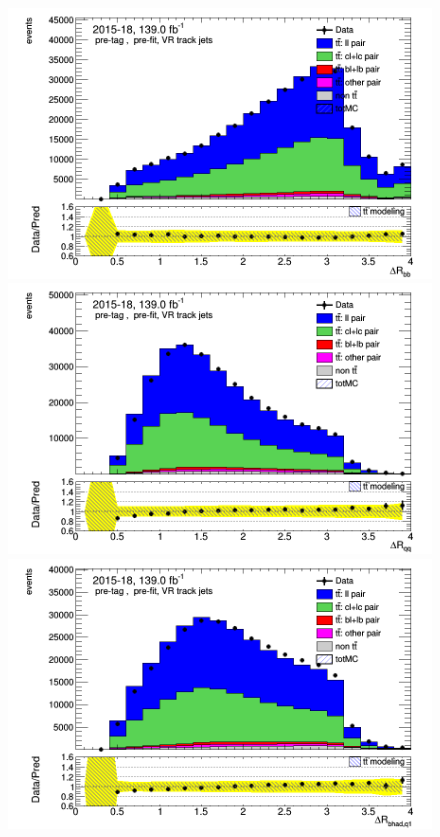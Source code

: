 \documentclass[letterpaper,12pt]{article}
\begin{document}
	
	\begin{figure}
	\begin{minipage}[b]{.45\textwidth}
	\centering
	\includegraphics[width=1\textwidth]{Oct_distributions/pretagNoRwDL1rwithhighpTVRJets_scaledall/DataMC_dRbb.png}
	\end{minipage}\hfill
	\begin{minipage}[b]{.45\textwidth}
	\centering
	\includegraphics[width=1\textwidth]{Oct_distributions/pretagNoRwDL1rwithhighpTVRJets_scaledall/DataMC_dRqq.png}
	\end{minipage}\hfill
	\begin{minipage}[b]{.45\textwidth}
	\centering
	\includegraphics[width=1\textwidth]{Oct_distributions/pretagNoRwDL1rwithhighpTVRJets_scaledall/DataMC_dRbhadq1.png}

\end{minipage}
\end{figure}
\end{document}
